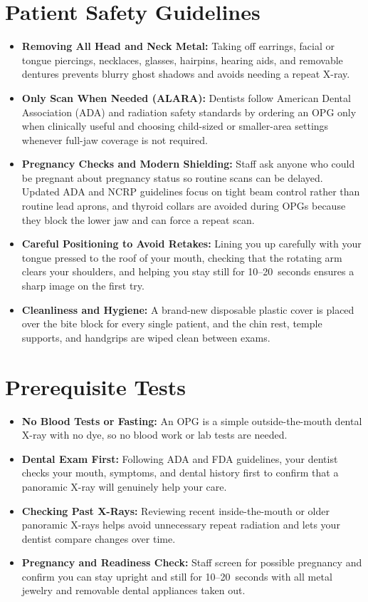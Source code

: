 \section{Patient Safety Guidelines}
\begin{itemize}
\item \textbf{Removing All Head and Neck Metal:} Taking off earrings, facial or tongue piercings, necklaces, glasses, hairpins, hearing aids, and removable dentures prevents blurry ghost shadows and avoids needing a repeat X-ray.
\item \textbf{Only Scan When Needed (ALARA):} Dentists follow American Dental Association (ADA) and radiation safety standards by ordering an OPG only when clinically useful and choosing child-sized or smaller-area settings whenever full-jaw coverage is not required.
\item \textbf{Pregnancy Checks and Modern Shielding:} Staff ask anyone who could be pregnant about pregnancy status so routine scans can be delayed. Updated ADA and NCRP guidelines focus on tight beam control rather than routine lead aprons, and thyroid collars are avoided during OPGs because they block the lower jaw and can force a repeat scan.
\item \textbf{Careful Positioning to Avoid Retakes:} Lining you up carefully with your tongue pressed to the roof of your mouth, checking that the rotating arm clears your shoulders, and helping you stay still for 10--20~seconds ensures a sharp image on the first try.
\item \textbf{Cleanliness and Hygiene:} A brand-new disposable plastic cover is placed over the bite block for every single patient, and the chin rest, temple supports, and handgrips are wiped clean between exams.
\end{itemize}

\section{Prerequisite Tests}
\begin{itemize}
\item \textbf{No Blood Tests or Fasting:} An OPG is a simple outside-the-mouth dental X-ray with no dye, so no blood work or lab tests are needed.
\item \textbf{Dental Exam First:} Following ADA and FDA guidelines, your dentist checks your mouth, symptoms, and dental history first to confirm that a panoramic X-ray will genuinely help your care.
\item \textbf{Checking Past X-Rays:} Reviewing recent inside-the-mouth or older panoramic X-rays helps avoid unnecessary repeat radiation and lets your dentist compare changes over time.
\item \textbf{Pregnancy and Readiness Check:} Staff screen for possible pregnancy and confirm you can stay upright and still for 10--20~seconds with all metal jewelry and removable dental appliances taken out.
\end{itemize}

